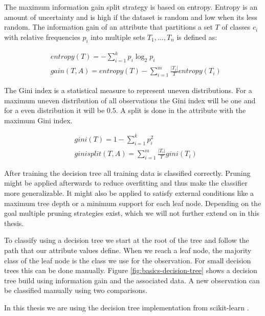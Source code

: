 \documentclass[pdftex,12pt,a4paper]{report}
\begin{document}
The maximum information gain split strategy is based on entropy. Entropy is an amount of uncertainty and is high if the dataset is random and low when its less random. The information gain of an attribute that partitions a set $T$ of classes $c_i$ with relative frequencies $p_i$ into multiple sets $T_1, ..., T_n$ is defined as:

\begin{equation}
\begin{split}
	& entropy(T) = - \sum_{i=1}^{k} p_i \log_2 p_i \\	
	& gain(T,A) = entropy(T) - \sum_{i=1}^{m} \frac{|T_i|}{T} entropy(T_i)
\end{split}
\end{equation}

The Gini index is a statistical measure to represent uneven distributions. For a maximum uneven distribution of all observations the Gini index will be one and for a even distribution it will be $0.5$. A split is done in the attribute with the maximum Gini index.

\begin{equation}
\begin{split}
& gini(T) = 1 - \sum_{i=1}^{k} p_i^2 \\
& ginisplit(T,A) = \sum_{i=1}^{m} \frac{|T_i|}{T} gini(T_i) 
\end{split}
\end{equation}

After training the decision tree all training data is classified correctly. Pruning might be applied afterwards to reduce overfitting and thus make the classifier more generalizable. It might also be applied to satisfy external conditions like a maximum tree depth or a minimum support for each leaf node. Depending on the goal multiple pruning strategies exist, which we will not further extend on in this thesis.

To classify using a decision tree we start at the root of the tree and follow the path that our attribute values define. When we reach a leaf node, the majority class of the leaf node is the class we use for the observation. For small decision trees this can be done manually. Figure \ref{fig:basics-decision-tree} shows a decision tree build using information gain and the associated data. A new observation can be classified manually using two comparisons.

In this thesis we are using the decision tree implementation from scikit-learn \cite{pedregosa2011scikit}.
\end{document}
